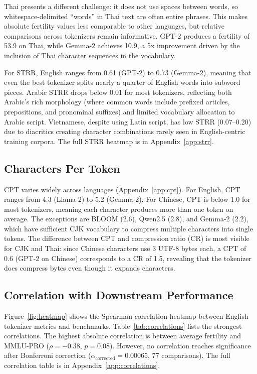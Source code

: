 \documentclass[11pt]{article}
\begin{document}
Thai presents a different challenge: it does not use spaces between words, so whitespace-delimited ``words'' in Thai text are often entire phrases. This makes absolute fertility values less comparable to other languages, but relative comparisons across tokenizers remain informative. GPT-2 produces a fertility of 53.9 on Thai, while Gemma-2 achieves 10.9, a 5x improvement driven by the inclusion of Thai character sequences in the vocabulary.

For STRR, English ranges from 0.61 (GPT-2) to 0.73 (Gemma-2), meaning that even the best tokenizer splits nearly a quarter of English words into subword pieces. Arabic STRR drops below 0.01 for most tokenizers, reflecting both Arabic's rich morphology (where common words include prefixed articles, prepositions, and pronominal suffixes) and limited vocabulary allocation to Arabic script. Vietnamese, despite using Latin script, has low STRR (0.07--0.20) due to diacritics creating character combinations rarely seen in English-centric training corpora. The full STRR heatmap is in Appendix~\ref{app:strr}.

\subsection{Characters Per Token}

CPT varies widely across languages (Appendix~\ref{app:cpt}). For English, CPT ranges from 4.3 (Llama-2) to 5.2 (Gemma-2). For Chinese, CPT is below 1.0 for most tokenizers, meaning each character produces more than one token on average. The exceptions are BLOOM (2.6), Qwen2.5 (2.8), and Gemma-2 (2.2), which have sufficient CJK vocabulary to compress multiple characters into single tokens. The difference between CPT and compression ratio (CR) is most visible for CJK and Thai: since Chinese characters use 3 UTF-8 bytes each, a CPT of 0.6 (GPT-2 on Chinese) corresponds to a CR of 1.5, revealing that the tokenizer does compress bytes even though it expands characters.

\subsection{Correlation with Downstream Performance}

Figure~\ref{fig:heatmap} shows the Spearman correlation heatmap between English tokenizer metrics and benchmarks. Table~\ref{tab:correlations} lists the strongest correlations. The highest absolute correlation is between average fertility and MMLU-PRO ($\rho = -0.38$, $p = 0.08$). However, no correlation reaches significance after Bonferroni correction ($\alpha_\text{corrected} = 0.00065$, 77 comparisons). The full correlation table is in Appendix~\ref{app:correlations}.
\end{document}
